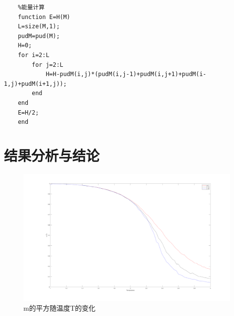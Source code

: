 \documentclass[UTF8,a4paper,10pt]{ctexart}
\begin{document}
\begin{lstlisting}
    %能量计算
    function E=H(M)
    L=size(M,1);
    pudM=pud(M);
    H=0;
    for i=2:L
        for j=2:L
            H=H-pudM(i,j)*(pudM(i,j-1)+pudM(i,j+1)+pudM(i-1,j)+pudM(i+1,j));
        end
    end
    E=H/2;
    end
\end{lstlisting}

\section{结果分析与结论}

\begin{figure}[!htbp]
    \centering
    \includegraphics[width=1\textwidth,height=1\textwidth]{pictures/m2.png}
    \caption{m的平方随温度T的变化} \label{m2}
\end{figure}
\end{document}
